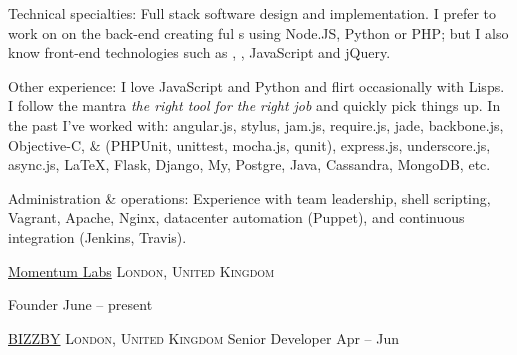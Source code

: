 \documentclass[10pt,a4paper]{article}
\begin{document}
\inlineheadsection  %
  {Technical specialties:}
  {Full stack software design and implementation. I prefer to work on on the back-end creating ful s using Node.JS, Python or PHP; but I also know front-end technologies such as , , JavaScript and jQuery.}

\inlineheadsection  %
  {Other experience:}
  {I love JavaScript and Python and flirt occasionally with Lisps. I follow the mantra \emph{the right tool for the right job} and quickly pick things up. In the past I've worked with: angular.js, stylus, jam.js, require.js, jade, backbone.js, Objective-C,  \&  (PHPUnit, unittest, mocha.js, qunit), express.js, underscore.js, async.js, \LaTeX, Flask, Django, My, Postgre, Java, Cassandra, MongoDB, etc.}

\inlineheadsection  %
  {Administration \& operations:}
  {Experience with team leadership, shell scripting, Vagrant, Apache, Nginx, datacenter automation (Puppet), and continuous integration (Jenkins, Travis).}

\spacedhrule{1.5em}{-0.4em}


\headedsection  %
  {\href{http://www.momentumlabs.io}{Momentum Labs}}
  {\textsc{London, United Kingdom}} {%

  \headedsubsection  %
    {Founder}
    {June  -- present}
    {
  }
}

\headedsection
  {\href{http://www.bizzby.com}{BIZZBY}}
  {\textsc{London, United Kingdom}} {%
  \headedsubsection
    {Senior Developer}
    {Apr  -- Jun }
    {}
}
\end{document}
